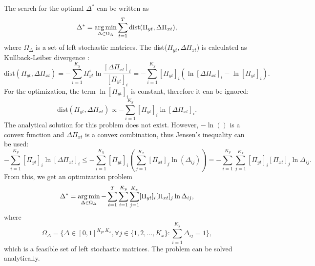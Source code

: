 The search for the optimal $\Delta^{*}$ can be written as
\begin{equation}
    \Delta^* = \operatorname*{arg\,min}_{\Delta \in \Omega_{\Delta}} \sum_{t=1}^T \text{dist}(\Pi_{yt}, \Delta\Pi_{xt}),
\end{equation}
where $\Omega_{\Delta}$ is a set of left stochastic matrices. The dist($\Pi_{yt}, \Delta\Pi_{xt}$) is calculated as Kullback-Leiber divergence \cite{Kullback1951}:
\begin{equation}
    \text{dist}(\Pi_{yt}, \Delta\Pi_{xt}) = - \sum_{i=1}^{K_y} \Pi_{yt}^i \ln\frac{[\Delta\Pi_{xt}]_i}{[\Pi_{yt}]_i} = - \sum_{i=1}^{K_y} [\Pi_{yt}]_i (\ln [\Delta\Pi_{xt}]_i - \ln [\Pi_{yt}]_i).
\end{equation}
For the optimization, the term $\ln [\Pi_{yt}]_i$ is constant, therefore it can be ignored:
\begin{equation}
    \text{dist}(\Pi_{yt}, \Delta\Pi_{xt}) \propto - \sum_{i=1}^{K_y} [\Pi_{yt}]_i \ln [\Delta\Pi_{xt}]_i.
\end{equation}
The analytical solution for this problem does not exist. However, $-\ln()$ is a convex function and $\Delta\Pi_{xt}$ is a convex combination, thus Jensen's inequality can be used:
\begin{equation}
    - \sum_{i=1}^{K_y} [\Pi_{yt}]_i \ln [\Delta\Pi_{xt}]_i \leq - \sum_{i=1}^{K_y} [\Pi_{yt}]_i ( \sum_{j=1}^{K_x} [\Pi_{xt}]_j \ln (\Delta_{ij}) ) = - \sum_{i=1}^{K_y} \sum_{j=1}^{K_x} [\Pi_{yt}]_i [\Pi_{xt}]_j \ln \Delta_{ij}.
\end{equation}
From this, we get an optimization problem
\begin{equation}
    \Delta^* = \operatorname*{arg\,min}_{\Delta \in \Omega_{\Delta}} - \sum_{t=1}^T \sum_{i=1}^{K_y} \sum_{j=1}^{K_x} [\Pi_{yt}]_i [\Pi_{xt}]_j \ln \Delta_{ij},
\end{equation}
where
\begin{equation}
    \Omega_{\Delta} = \{ \Delta \in [0, 1]^{K_y,K_x}, \forall j \in \{ 1, 2, \dots, K_x \} : \sum_{i=1}^{K_y} \Delta_{ij} = 1 \},
\end{equation}
which is a feasible set of left stochastic matrices. The problem can be solved analytically.

